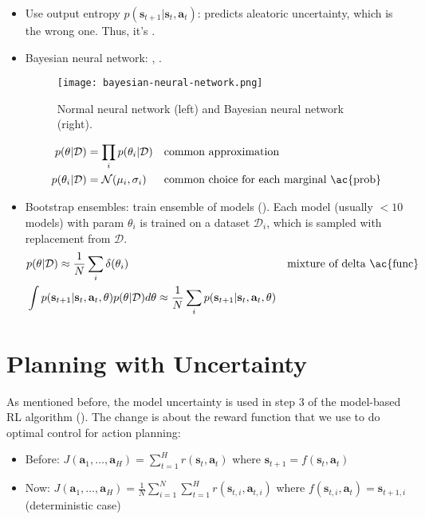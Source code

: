 \begin{itemize}
	\item Use output entropy $p(\textbf{s}_{t+1} | \textbf{s}_t, \textbf{a}_t)$: predicts aleatoric uncertainty, which is the wrong one. Thus, it's .	
	\item Bayesian neural network:  \cite{blundell2015icml}, \cite{gal2017concrete}.
	\begin{figure}[hbt!]
		\centering
		\texttt{[image: bayesian-neural-network.png]}
		\caption{Normal neural network (left) and Bayesian neural network (right).}
	\end{figure}
	\begin{align}
		p(\theta | \mathcal{D}) & = \prod_{i} p(\theta_i | \mathcal{D}) && \text{common approximation}\\
		p(\theta_i | \mathcal{D}) & = \mathcal{N}(\mu_i, \sigma_i) && \text{common choice for each marginal \ac{prob}}
	\end{align}
	\item Bootstrap ensembles: train ensemble of models (). Each model (usually $<10$ models) with \ac{param} $\theta_i$ is trained on a dataset $\mathcal{D}_i$, which is sampled with replacement from $\mathcal{D}$.
	\begin{align}
		&p(\theta | \mathcal{D}) \approx \frac{1}{N} \sum_{i} \delta(\theta_i) && \text{mixture of delta \ac{func}}\\
		&\int p(\textbf{s}_{t+1} | \textbf{s}_t, \textbf{a}_t, \theta) p(\theta|\mathcal{D}) d\theta \approx \frac{1}{N} \sum_i p(\textbf{s}_{t+1} | \textbf{s}_t, \textbf{a}_t, \theta)
	\end{align}
\end{itemize}

\section{Planning with Uncertainty}
As mentioned before, the model uncertainty is used in step 3 of the model-based \ac{RL} algorithm (). The change is about the reward function that we use to do optimal control for action planning:
\begin{itemize}
	\item Before: $\displaystyle J(\textbf{a}_1,\dots, \textbf{a}_H) = \sum_{t=1}^{H} r(\textbf{s}_t, \textbf{a}_t)$ where $\textbf{s}_{t+1} = f(\textbf{s}_t, \textbf{a}_t) $
	\item Now: $\displaystyle J(\textbf{a}_1,\dots, \textbf{a}_H) = \frac{1}{N} \sum_{i=1}^{N} \sum_{t=1}^{H} r(\textbf{s}_{t,i}, \textbf{a}_{t,i})$ where $f(\textbf{s}_{t,i}, \textbf{a}_t) = \textbf{s}_{t+1, i}$ (deterministic case)
\end{itemize}

